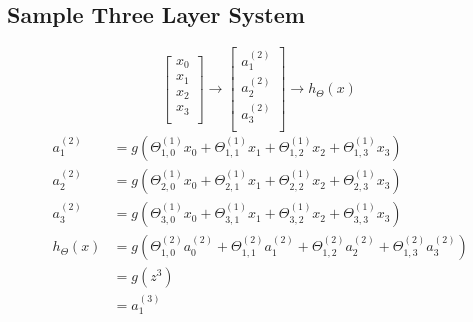 \documentclass[11pt, oneside]{article}
\begin{document}
\subsection{Sample Three Layer System}
\begin{figure}[!h]
    \centering
    \begin{minipage}{.5\textwidth}
    	\centering
        \begin{equation*}
			\begin{bmatrix} 
				x_0 \\
				x_1 \\
				x_2 \\
				x_3 \\
			\end{bmatrix}
			\rightarrow
			\begin{bmatrix} 
				a_1^{(2)} \\
				a_2^{(2)} \\
				a_3^{(2)} \\
			\end{bmatrix}
			\rightarrow
			h_\Theta(x)
		\end{equation*}
		\begin{align*}
			a_1^{(2)} &= g(\Theta_{1,0}^{(1)} x_0 + \Theta_{1,1}^{(1)} x_1 + \Theta_{1,2}^{(1)} x_2 + \Theta_{1,3}^{(1)} x_3) \\
			a_2^{(2)} &= g(\Theta_{2,0}^{(1)} x_0 + \Theta_{2,1}^{(1)} x_1 + \Theta_{2,2}^{(1)} x_2 + \Theta_{2,3}^{(1)} x_3) \\
			a_3^{(2)} &= g(\Theta_{3,0}^{(1)} x_0 + \Theta_{3,1}^{(1)} x_1 + \Theta_{3,2}^{(1)} x_2 + \Theta_{3,3}^{(1)} x_3) \\
			h_\Theta(x) &= g(\Theta_{1,0}^{(2)} a_0^{(2)} + \Theta_{1,1}^{(2)} a_1^{(2)} + \Theta_{1,2}^{(2)} a_2^{(2)} + \Theta_{1,3}^{(2)} a_3^{(2)})\\
			&= g(z^3)\\
			&= a_1^{(3)}
		\end{align*}
    \end{minipage}%
    \begin{minipage}{0.5\textwidth}
    	\centering
\end{minipage}
\end{figure}
\end{document}
